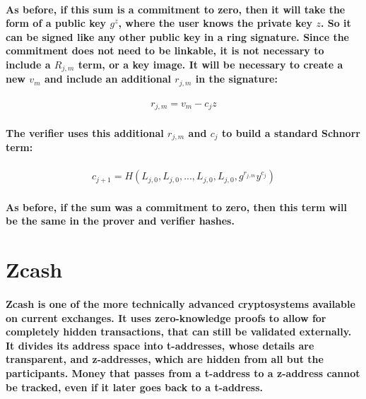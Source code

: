 \documentclass{article}
\begin{document}
\paragraph{As before, if this sum is a commitment to zero, then it will take the form of a public key $g^z$, where the user knows the private key $z$.  So it can be signed like any other public key in a ring signature.  Since the commitment does not need to be linkable, it is not necessary to include a $R_{j,m}$ term, or a key image.  It will be necessary to create a new $v_m$ and include an additional $r_{j,m}$ in the signature:}

\begin{eqnarray}
  r_{j,m} = v_m - c_j z
\end{eqnarray}

\paragraph{The verifier uses this additional $r_{j,m}$ and $c_j$ to build a standard Schnorr term:}

\begin{eqnarray}
  c_{j+1} = H(L_{j,0}, L_{j,0}, ... , L_{j,0}, L_{j,0}, g^{r_{j,m}} y^{c_j})
\end{eqnarray}

\paragraph{As before, if the sum was a commitment to zero, then this term will be the same in the prover and verifier hashes.}



\section{Zcash}

\paragraph{Zcash is one of the more technically advanced cryptosystems available on current exchanges.  It uses zero-knowledge proofs to allow for completely hidden transactions, that can still be validated externally.  It divides its address space into t-addresses, whose details are transparent, and z-addresses, which are hidden from all but the participants.  Money that passes from a t-address to a z-address cannot be tracked, even if it later goes back to a t-address.}
\end{document}
